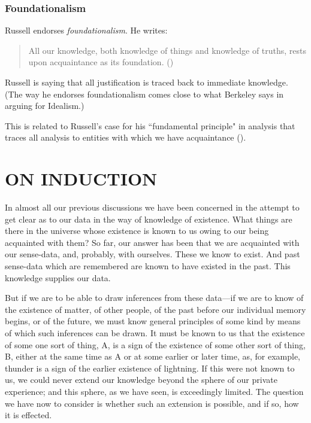 \documentclass[oneside,letterpaper,12pt]{book}
\begin{document}
\subsection*{Foundationalism}
Russell endorses \textit{foundationalism}. He writes:
\begin{quote}
	All our knowledge, both knowledge of things and knowledge of truths, rests upon acquaintance as its foundation. (\pageref{foundationalism})
\end{quote} 
Russell is saying that all justification is traced back to immediate knowledge. (The way he endorses foundationalism comes close to what Berkeley says in arguing for Idealism.)

This is related to Russell's case for his ``fundamental principle" in analysis that traces all analysis to entities with which we have acquaintance (\pageref{fundamental}).

\hypertarget{chapter-vi.-on-induction}{%
\chapter{ON INDUCTION}\label{chapter-vi.-on-induction}}

In almost all our previous discussions we have been concerned in the
attempt to get clear as to our data in the way of knowledge of
existence. What things are there in the universe whose existence is
known to us owing to our being acquainted with them? So far, our answer
has been that we are acquainted with our sense-data, and, probably, with
ourselves. These we know to exist. And past sense-data which are
remembered are known to have existed in the past. This knowledge
supplies our data.

But if we are to be able to draw inferences from these data---if we are
to know of the existence of matter, of other people, of the past before
our individual memory begins, or of the future, we must know general
principles of some kind by means of which such inferences can be drawn.
It must be known to us that the existence of some one sort of thing, A,
is a sign of the existence of some other sort of thing, B, either at the
same time as A or at some earlier or later time, as, for example,
thunder is a sign of the earlier existence of lightning. If this were
not known to us, we could never extend our knowledge beyond the sphere
of our private experience; and this sphere, as we have seen, is
exceedingly limited. The question we have now to consider is whether
such an extension is possible, and if so, how it is effected.
\end{document}

